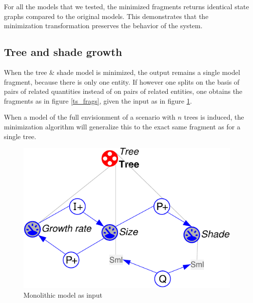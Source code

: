 \documentclass{article} %
\begin{document}
For all the models that we tested, the minimized fragments returns identical 
state graphs compared to the original models. This demonstrates that the
minimization transformation preserves the behavior of the system.


\subsection{Tree and shade growth} 

When the tree \& shade model is minimized, the output remains a single model
fragment, because there is only one entity. If however one splits on the basis
of pairs of related quantities instead of on pairs of related entities, one
obtains the fragments as in figure \ref{ts_frags}, given the input as in figure
\ref{ts_mono}.

When a model of the full envisionment of a scenario with $n$ trees is induced,
the minimization algorithm will generalize this to the exact same fragment as
for a single tree.


\begin{figure}[ht]
\centering
\includegraphics[scale=0.5]{ts_mono-crop.pdf}
\caption{Monolithic model as input}
\label{ts_mono}
\end{figure}
\end{document}
